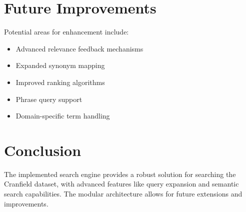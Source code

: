 \documentclass[12pt,a4paper]{article}
\begin{document}
\section{Future Improvements}
Potential areas for enhancement include:

\begin{itemize}
    \item Advanced relevance feedback mechanisms
    \item Expanded synonym mapping
    \item Improved ranking algorithms
    \item Phrase query support
    \item Domain-specific term handling
\end{itemize}

\section{Conclusion}
The implemented search engine provides a robust solution for searching the Cranfield dataset, with advanced features like query expansion and semantic search capabilities. The modular architecture allows for future extensions and improvements.
\end{document}
